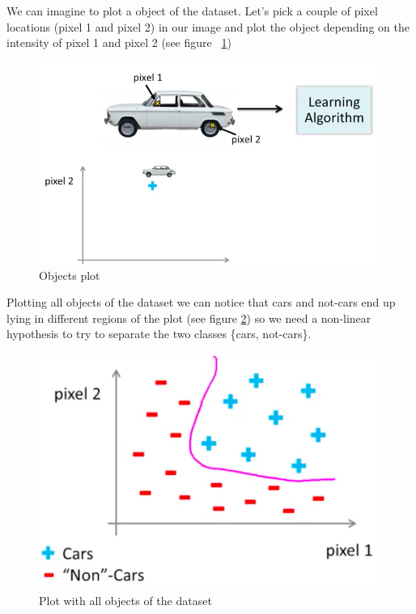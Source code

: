 We can imagine to plot a object of the dataset. Let's pick a couple of pixel locations (pixel 1 and pixel 2) in our image and plot the object depending on the intensity of pixel 1 and pixel 2 (see figure ~\ref{plotcvproblem})

\begin{figure}[H]
\begin{center}
\includegraphics[scale=0.25]{images/plotcvproblem}
\end{center}
\caption{Objects plot} 
\label{plotcvproblem}
\end{figure}

Plotting all objects of the dataset we can notice that cars and not-cars end up lying in different regions of the plot (see figure \ref{platoonobjs}) so we need a non-linear hypothesis to try to separate the two classes \{cars, not-cars\}.

\begin{figure}[H]
\begin{center}
\includegraphics[scale=0.25]{images/platoonobjs}
\end{center}
\caption{Plot with all objects of the dataset} 
\label{platoonobjs}
\end{figure}

